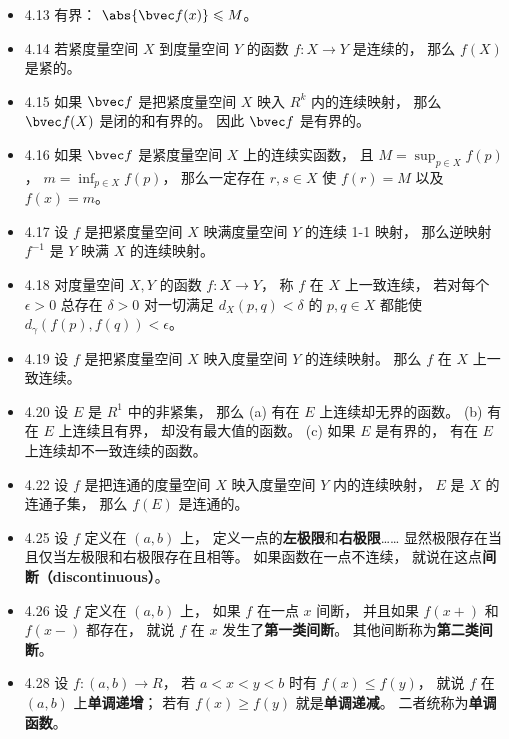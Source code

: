 \begin{itemize}
\item 4.13 有界： $\abs{\bvec f(x)}\leqslant M$。

\item 4.14 若紧度量空间 $X$ 到度量空间 $Y$ 的函数 $f:X\to Y$ 是连续的， 那么 $f(X)$ 是紧的。

\item 4.15 如果 $\bvec f$ 是把紧度量空间 $X$ 映入 $R^k$ 内的连续映射， 那么 $\bvec f(X)$ 是闭的和有界的。 因此 $\bvec f$ 是有界的。

\item 4.16 如果 $\bvec f$ 是紧度量空间 $X$ 上的连续实函数， 且 $M = \sup_{p\in X} f(p)$， $m=\inf_{p\in X} f(p)$， 那么一定存在 $r,s\in X$ 使 $f(r)=M$ 以及 $f(x)=m$。

\item 4.17 设 $f$ 是把紧度量空间 $X$ 映满度量空间 $Y$ 的连续 1-1 映射， 那么逆映射 $f^{-1}$ 是 $Y$ 映满 $X$ 的连续映射。

\item 4.18 对度量空间 $X,Y$ 的函数 $f:X\to Y$， 称 $f$ 在 $X$ 上一致连续， 若对每个 $\epsilon>0$ 总存在 $\delta >0$ 对一切满足 $d_X(p,q)<\delta$ 的 $p,q\in X$ 都能使 $d_\gamma(f(p),f(q))<\epsilon$。

\item 4.19 设 $f$ 是把紧度量空间 $X$ 映入度量空间 $Y$ 的连续映射。 那么 $f$ 在 $X$ 上一致连续。

\item 4.20 设 $E$ 是 $R^1$ 中的非紧集， 那么 (a) 有在 $E$ 上连续却无界的函数。 (b) 有在 $E$ 上连续且有界， 却没有最大值的函数。 (c) 如果 $E$ 是有界的， 有在 $E$ 上连续却不一致连续的函数。

\item 4.22 设 $f$ 是把连通的度量空间 $X$ 映入度量空间 $Y$ 内的连续映射， $E$ 是 $X$ 的连通子集， 那么 $f(E)$ 是连通的。

\item 4.25 设 $f$ 定义在 $(a,b)$ 上， 定义一点的\textbf{左极限}和\textbf{右极限}…… 显然极限存在当且仅当左极限和右极限存在且相等。 如果函数在一点不连续， 就说在这点\textbf{间断（discontinuous）}。

\item 4.26 设 $f$ 定义在 $(a,b)$ 上， 如果 $f$ 在一点 $x$ 间断， 并且如果 $f(x+)$ 和 $f(x-)$ 都存在， 就说 $f$ 在 $x$ 发生了\textbf{第一类间断}。 其他间断称为\textbf{第二类间断}。

\item 4.28 设 $f:(a,b)\to R$， 若 $a<x<y<b$ 时有 $f(x)\leqslant f(y)$， 就说 $f$ 在 $(a,b)$ 上\textbf{单调递增}； 若有 $f(x)\geqslant f(y)$ 就是\textbf{单调递减}。 二者统称为\textbf{单调函数}。


\end{itemize}
